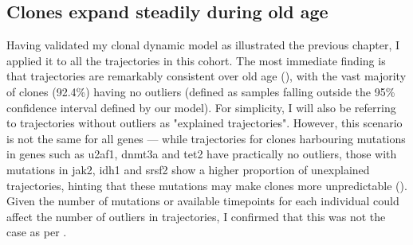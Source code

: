 \begin{figure}[!ht]
	\label{fig:ch-mutations-per-gene}
\end{figure}

\subsection{Clones expand steadily during old age}

Having validated my clonal dynamic model as illustrated the previous chapter, I applied it to all the trajectories in this cohort. The most immediate finding is that trajectories are remarkably consistent over old age (), with the vast majority of clones (92.4\%) having no outliers (defined as samples falling outside the 95\% confidence interval defined by our model). For simplicity, I will also be referring to trajectories without outliers as "explained trajectories". However, this scenario is not the same for all genes --- while trajectories for clones harbouring mutations in genes such as \ac{u2af1}, \ac{dnmt3a} and \ac{tet2} have practically no outliers, those with mutations in \ac{jak2}, \ac{idh1} and \ac{srsf2} show a higher proportion of unexplained trajectories, hinting that these mutations may make clones more unpredictable (). Given the number of mutations or available timepoints for each individual could affect the number of outliers in trajectories, I confirmed that this was not the case as per . 

\begin{figure}[!ht]
	\label{fig:ch-trajectories-examples}
\end{figure}

\begin{figure}[!ht]
	\label{fig:ch-trajectories-explained-gene}
\end{figure}


